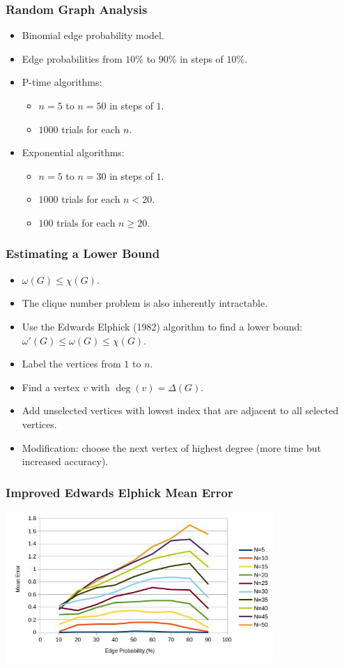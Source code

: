 \documentclass{beamer}
\newcommand{\w}{\omega}
\newcommand{\D}{\Delta}
\newcommand{\X}{\chi}
\begin{document}
\begin{frame}
  \frametitle{Random Graph Analysis}
  \begin{itemize}
  \item Binomial edge probability model.
  \item Edge probabilities from \(10\%\) to \(90\%\) in steps of \(10\%\).
  \item P-time algorithms:
    \begin{itemize}
    \item \(n=5\) to \(n=50\) in steps of \(1\).
    \item \(1000\) trials for each \(n\).
    \end{itemize}
  \item Exponential algorithms:
    \begin{itemize}
    \item \(n=5\) to \(n=30\) in steps of \(1\).
    \item \(1000\) trials for each \(n<20\).
    \item \(100\) trials for each \(n\ge20\).
    \end{itemize}
  \end{itemize}
\end{frame}

\begin{frame}
  \frametitle{Estimating a Lower Bound}
  \begin{itemize}
  \item \(\w(G)\le\X(G)\).
  \item The clique number problem is also inherently intractable.
  \item Use the Edwards Elphick (1982) algorithm to find a lower bound: \(\w'(G)\le\w(G)\le\X(G)\).
  \item Label the vertices from \(1\) to \(n\).
  \item Find a vertex \(v\) with \(\deg(v)=\D(G)\).
  \item Add unselected vertices with lowest index that are adjacent to all selected vertices.
  \item Modification: choose the next vertex of highest degree (more time but increased accuracy).
  \end{itemize}
\end{frame}

\begin{frame}
  \frametitle{Improved Edwards Elphick Mean Error}
  \begin{center}
    \includegraphics[width=4in]{../final/edwards2_error}
  \end{center}
\end{frame}
\end{document}
